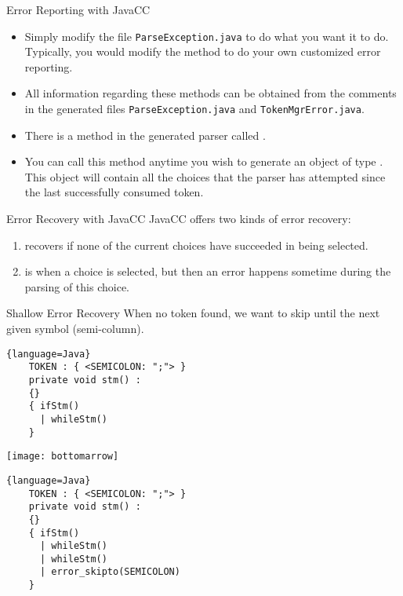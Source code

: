 \begin{bibunit}[apalike]
\begin{frame}{Error Reporting with JavaCC}
	\begin{itemize}
	\item Simply modify the file \texttt{ParseException.java} to do what you want it to do. Typically, you would modify the  method to do your own customized error reporting.
	\item All information regarding these methods can be obtained from the comments in the generated files \texttt{ParseException.java} and \texttt{TokenMgrError.java}.
	\vfill
	\item There is a method in the generated parser called .
	\item You can call this method anytime you wish to generate an object of type . This object will contain all the choices that the parser has attempted since the last successfully consumed token.
	\end{itemize}
\end{frame}

\begin{frame}{Error Recovery with JavaCC}
	JavaCC offers two kinds of error recovery:
	\vfill
	\begin{enumerate}
	\item[Shallow recovery] recovers if none of the current choices have succeeded in being selected.
	\vfill
	\item[Deep recovery] is when a choice is selected, but then an error happens sometime during the parsing of this choice.
	\end{enumerate}
\end{frame}

\begin{frame}[fragile]{Shallow Error Recovery}
	When no token found, we want to skip until the next given symbol (semi-column). \\
	\begin{lstlisting}{language=Java}
	TOKEN : { <SEMICOLON: ";"> }
	private void stm() :
	{}
	{ ifStm()
	  | whileStm()
	}
	\end{lstlisting}
	\begin{center}\texttt{[image: bottomarrow]}\end{center}
	\begin{lstlisting}{language=Java}
	TOKEN : { <SEMICOLON: ";"> }
	private void stm() :
	{}
	{ ifStm()
	  | whileStm()
	  | whileStm()
	  | error_skipto(SEMICOLON)
	}
	\end{lstlisting}
\end{frame}


\end{bibunit}

